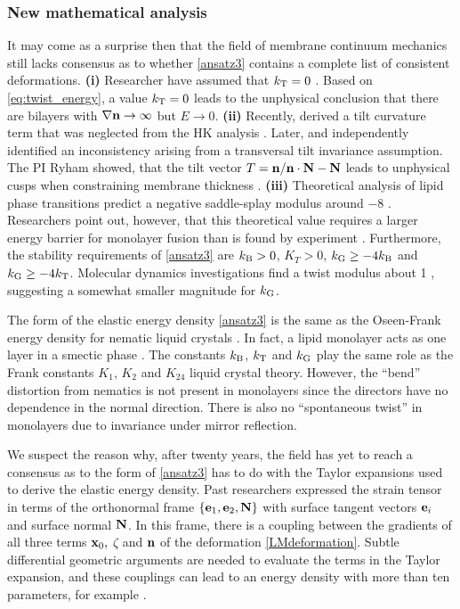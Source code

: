 \subsubsection{New mathematical analysis}
 It may come as a surprise then that the field of membrane continuum mechanics still lacks consensus as to
 whether \eqref{ansatz3} contains a complete list of consistent deformations.
\textbf{(i)} Researcher have assumed that $k_{\mathrm{T}} = 0$ \cite{Hamm2000, TerziDeserno17, C9SM02079A, PhysRevE.102.042406}.
  Based on \eqref{eq:twist_energy}, a value $k_{\mathrm{T}} = 0$ leads to the
  unphysical conclusion that there are bilayers with $\nabla {\bf n} \to \infty$ but $E \to 0.$ 
  \textbf{(ii)}
  Recently, \cite{TerziDeserno17} derived a tilt curvature term that was neglected from the HK analysis \cite{Hamm2000}.
  Later, \cite{C9SM02079A} 
  and \cite{PhysRevE.102.042406} independently identified an inconsistency \cite{TerziDeserno17} arising
  from a transversal tilt invariance assumption.
  The PI Ryham showed,  that the tilt vector $T = {\bf n}/{\bf n}\cdot {\bf N} - {\bf N}$ leads to unphysical cusps when constraining membrane thickness  \cite{RyKlYaCo16}.  
  \textbf{(iii)}
  Theoretical analysis of lipid phase transitions predict a negative saddle-splay modulus around $-8$ \kBT\;
\cite{SIEGEL2004366,SIEGEL20085200}. Researchers point out, however, that this theoretical value requires a larger energy 
barrier for monolayer fusion than is found by experiment \cite{FrRoPi17,Tran7106,TerziDeserno17}.
Furthermore, the stability requirements of \eqref{ansatz3} are $k_{\mathrm{B}} > 0$, $K_T > 0$, $k_{\mathrm{G}} \geq -4k_{\mathrm{B}}$
and $k_{\mathrm{G}} \geq -4k_{\mathrm{T}}$. Molecular dynamics investigations find a twist modulus about 1 \kBT \cite{LeVeWa14},
suggesting a somewhat smaller magnitude for $k_{\mathrm{G}}$.

 
The form of the elastic energy density \eqref{ansatz3} is the same as
the Oseen-Frank energy density for nematic liquid crystals \cite{ANDRIENKO2018520,Tran7106,Helfrich73}.   In fact,  
a lipid monolayer acts as one layer in a smectic  phase \cite{REYESMATEO1995978,Rangamani20140463,PhysRevLett.113.248102}. 
The constants $k_{\mathrm{B}}$, $k_{\mathrm{T}}$  and $k_{\mathrm{G}}$ play the same role as the Frank constants $K_1$, $K_2$ and $K_{24}$
liquid crystal theory. However, the ``bend'' distortion from nematics  
is not present in monolayers since the directors have no dependence in the normal direction.
There is also no ``spontaneous twist'' in monolayers due to invariance under mirror reflection. 
  
  We suspect the reason why, after twenty years, the field has yet to reach a consensus 
  as to the form of \eqref{ansatz3} has to do with the Taylor expansions used to derive the elastic energy density. 
  Past researchers expressed the strain tensor in
  terms of the orthonormal frame $\{{\bf e}_1, {\bf e}_2, {\bf N}\}$ with surface tangent vectors ${\bf e}_i$ and surface normal ${\bf N}$.  
  In this frame, there is a coupling between the gradients of all three terms ${\bf x}_0,$ $\zeta$ and ${\bf n}$ of the deformation \eqref{LMdeformation}.
  Subtle differential geometric arguments are needed to evaluate the terms in the Taylor expansion,
  and these couplings can lead to an energy density with more than ten parameters, for example \cite{PhysRevE.102.042406}.

